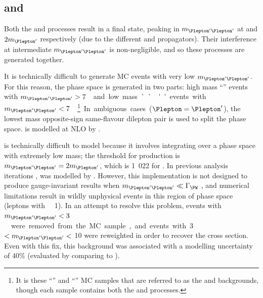 \subsection{\WZ and \Wgstar}
\label{sec:diboson:wgstar}

Both the \WZ and \Wgstar processes result in a  
final state, peaking in $m_{\HepProcess{\Plepton'\Plepton'}}$ at \mZ and 
$2m_{\Plepton'}$ respectively (due to the different \PZ and \Pphoton propagators). Their 
interference at intermediate $m_{\HepProcess{\Plepton'\Plepton'}}$ is non-negligible, and 
so these processes are generated together.

It is technically difficult to generate MC events with very low 
$m_{\HepProcess{\Plepton'\Plepton'}}$. For this reason, the phase space is generated in two 
parts: high mass ``\WZ'' events with \unit{$m_{\HepProcess{\Plepton'\Plepton'}} > 7$}{\GeV} 
and low mass ``\Wgstar'' events with 
\unit{$m_{\HepProcess{\Plepton'\Plepton'}} < 7$}{\GeV}.\footnote{
	It is these ``\WZ'' and ``\Wgstar''	MC samples that are referred to as the \WZ and 
	\Wgstar backgrounds, though each sample contains both the \WZ and \Wgstar processes.
}
In ambiguous cases ($\Plepton = \Plepton'$), the lowest mass opposite-sign same-flavour 
dilepton pair is used to split the phase space. \WZ is modelled at NLO by 
.

\Wgstar is technically difficult to model because it involves integrating over a phase 
space with extremely low mass; the threshold for production is 
$m_{\HepProcess{\Plepton'\Plepton'}} = 2m_{\Plepton'}$, which is \unit{1.022}{\MeV} for 
\HepProcess{\Plepton\Pnu\Pe\Pe}. In previous analysis iterations 
\cite{ATLAS:combination:2013}, \Wgstar was modelled by . 
However, this implementation is not designed to produce gauge-invariant results when 
$m_{\HepProcess{\Plepton'\Plepton'}} \ll \Gamma_{\PW}$ \cite{MadGraph:Wgstar}, and numerical 
limitations result in wildly unphysical events in this region of phase space 
(\eg leptons with \unit{\pt~\about~1}{\TeV}). In an attempt to resolve this problem, events 
with \unit{$m_{\HepProcess{\Plepton'\Plepton'}} < 3$}{\MeV} were removed from the MC 
sample, and events with \unit{3}{\MeV} $< m_{\HepProcess{\Plepton'\Plepton'}} <$ 
\unit{10}{\MeV} were reweighted in order to recover the cross section. Even with this fix, 
this background was associated with a modelling uncertainty of 40\% (evaluated by comparing 
to \sherpa).

